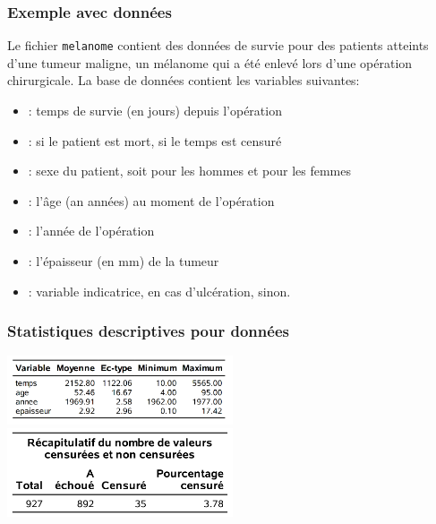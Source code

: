 \documentclass{beamer}
\begin{document}
\begin{frame}
\frametitle{Exemple avec données }
Le fichier \texttt{melanome} contient des données de survie pour des patients atteints d'une tumeur maligne, un mélanome qui a été enlevé lors d'une opération chirurgicale. La base de données contient les variables suivantes:


{ \footnotesize
\begin{itemize}
\item {}: temps de survie (en jours) depuis l'opération 
\item {}:  si le patient est mort,  si le temps est censuré
\item {}: sexe du patient, soit  pour les hommes et  pour les femmes
\item {}: l'âge (an années) au moment de l'opération
\item {}: l'année de l'opération
\item {}: l'épaisseur (en mm) de la tumeur
\item {}: variable indicatrice,  en cas d'ulcération,  sinon.
\end{itemize}
}

\end{frame}

\begin{frame}
\frametitle{Statistiques descriptives pour données }
\begin{center}
\includegraphics[width = 0.5\textwidth]{img/c7/diapos7e10}
\includegraphics[width = 0.5\textwidth]{img/c7/diapos7e09}
\end{center}
\end{frame}
\end{document}
